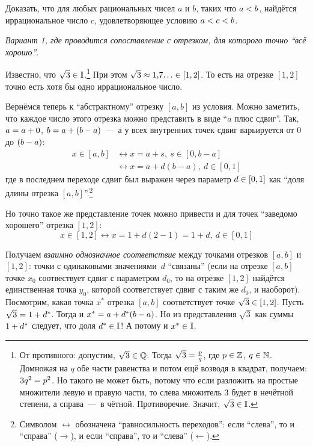 \documentclass[a4paper,12pt]{article}
\begin{document}
  Доказать, что для любых рациональных чисел $a$ и $b$, таких что $a \hm< b$, найдётся иррациональное число $c$, удовлетворяющее условию $a \hm< c \hm< b$.%
  
  \begin{solution}
  
    \mbox{}\par
    \emph{Вариант 1, где проводится сопоставление с отрезком, для которого точно ``всё хорошо''}.
    
    Известно, что $\sqrt 3 \hm\in \II$.\footnote{
      От противного: допустим, $\sqrt 3 \hm\in \QQ$.
      Тогда $\sqrt 3 \hm= \frac{p}{q}$, где $p \hm\in \ZZ$, $q \hm\in \NN$.
      Домножая на $q$ обе части равенства и потом ещё возводя в квадрат, получаем: $3 q^2 \hm= p^2$.
      Но такого не может быть, потому что если разложить на простые множители левую и правую части, то слева множитель $3$ будет в нечётной степени, а справа~---~в чётной.
      Противоречие.
      Значит, $\sqrt 3 \hm\in \II$.
    }
    При этом $\sqrt 3 \hm\approx 1{,}7{\ldots} \in [1, 2]$.
    То есть на отрезке $[1, 2]$ точно есть хотя бы одно иррациональное число.
    
    Вернёмся теперь к ``абстрактному'' отрезку $[a, b]$ из условия.
    Можно заметить, что каждое число этого отрезка можно представить в виде ``$a$ плюс сдвиг''.
    Так, $a \hm= a \hm+ 0$, $b \hm= a \hm+ (b \hm- a)$~---~а у всех внутренних точек сдвиг варьируется от $0$ до $(b \hm- a)$:
    \begin{equation}
    \begin{split}
      x \in [a, b] &\leftrightarrow x = a + s,\ s \in [0, b - a]\\
                   &\leftrightarrow x = a + d (b - a),\ d \in [0, 1]
    \end{split}
    \end{equation}
    где в последнем переходе сдвиг был выражен через параметр $d \hm\in [0, 1]$ как ``доля длины отрезка $[a, b]$''.\footnote{
      Символом $\leftrightarrow$ обозначена ``равносильность переходов'': если ``слева'', то и ``справа'' ($\rightarrow$), и если ``справа'', то и ``слева'' ($\leftarrow$).
    }
    
    Но точно такое же представление точек можно привести и для точек ``заведомо хорошего'' отрезка $[1, 2]$:
    \[
      x \in [1, 2] \leftrightarrow x = 1 + d (2 - 1) = 1 + d,\ d \in [0, 1]
    \]
    
    Получаем \emph{взаимно однозначное соответствие} между точками отрезков $[a, b]$ и $[1, 2]$: точки с одинаковыми значениями~$d$ ``связаны'' (если на отрезке $[a, b]$ точке $x_0$ соотвествует сдвиг с параметром $d_0$, то на отрезке $[1, 2]$ найдётся единственная точка $y_0$, которой соответствует сдвиг с таким же $d_0$, и наоборот).
    Посмотрим, какая точка $x^*$ отрезка $[a, b]$ соответствует точке $\sqrt 3 \hm\in [1, 2]$.
    Пусть $\sqrt 3 \hm= 1 \hm+ d^*$.
    Тогда и $x^* \hm= a \hm+ d^* (b - a)$.
    Но из представления $\sqrt 3$ как суммы $1 \hm+ d^*$ следует, что доля $d^* \hm\in \II$!
    А потому и $x^* \hm\in \II$.
    

\end{solution}
\end{document}
